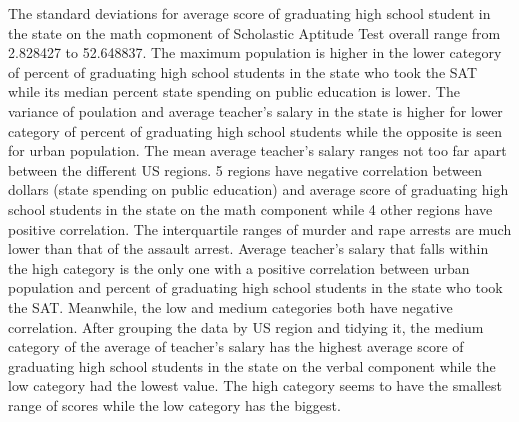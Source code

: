 \documentclass[
]{article}
\newenvironment{Shaded}{\begin{snugshade}}{\end{snugshade}}
\newcommand{\CommentTok}[1]{\textcolor[rgb]{0.56,0.35,0.01}{\textit{#1}}}
\newcommand{\DataTypeTok}[1]{\textcolor[rgb]{0.13,0.29,0.53}{#1}}
\newcommand{\DecValTok}[1]{\textcolor[rgb]{0.00,0.00,0.81}{#1}}
\newcommand{\KeywordTok}[1]{\textcolor[rgb]{0.13,0.29,0.53}{\textbf{#1}}}
\newcommand{\NormalTok}[1]{#1}
\newcommand{\OperatorTok}[1]{\textcolor[rgb]{0.81,0.36,0.00}{\textbf{#1}}}
\newcommand{\StringTok}[1]{\textcolor[rgb]{0.31,0.60,0.02}{#1}}
\begin{document}
The standard deviations for average score of graduating high school
student in the state on the math copmonent of Scholastic Aptitude Test
overall range from 2.828427 to 52.648837. The maximum population is
higher in the lower category of percent of graduating high school
students in the state who took the SAT while its median percent state
spending on public education is lower. The variance of poulation and
average teacher's salary in the state is higher for lower category of
percent of graduating high school students while the opposite is seen
for urban population. The mean average teacher's salary ranges not too
far apart between the different US regions. 5 regions have negative
correlation between dollars (state spending on public education) and
average score of graduating high school students in the state on the
math component while 4 other regions have positive correlation. The
interquartile ranges of murder and rape arrests are much lower than that
of the assault arrest. Average teacher's salary that falls within the
high category is the only one with a positive correlation between urban
population and percent of graduating high school students in the state
who took the SAT. Meanwhile, the low and medium categories both have
negative correlation. After grouping the data by US region and tidying
it, the medium category of the average of teacher's salary has the
highest average score of graduating high school students in the state on
the verbal component while the low category had the lowest value. The
high category seems to have the smallest range of scores while the low
category has the biggest.

\begin{Shaded}
\end{Shaded}
\end{document}
